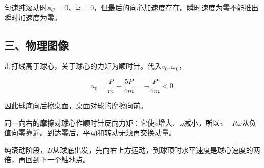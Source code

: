 \documentclass[12pt,a4paper,fontset=fandol]{ctexart}
\begin{document}
匀速纯滚动时\(\mathbf a_C=0\)、\(\dot{\boldsymbol\omega}=0\)，但最后的向心加速度存在。瞬时速度为零不能推出瞬时加速度为零。

\subsection{三、物理图像}\label{ux4e09ux7269ux7406ux56feux50cf-1}

击打线高于球心，关于球心的力矩为顺时针。代入\(v_0,\omega_0\)，

\[
u_0=\frac Pm-\frac{5P}{4m}
=-\frac P{4m}<0.
\]

因此球底向后擦桌面，桌面对球的摩擦向前。

\begin{center}
\begin{minipage}{\linewidth}
\centering\begingroup{}
\ifdim\wd\diagrambox>.88\linewidth
\sbox{\diagrambox}{\resizebox{.88\linewidth}{!}{\usebox{\diagrambox}}}\fi
\ifdim\ht\diagrambox>.38\textheight
\resizebox{!}{.38\textheight}{\usebox{\diagrambox}}
\else\usebox{\diagrambox}\fi
\par{}\endgroup\end{minipage}\end{center}

同一向右的摩擦对球心作顺时针反向力矩：它使\(v\)增大、\(\omega\)减小，所以\(v-R\omega\)从负值向零靠近。到达零后，平动和转动无须再交换动量。

纯滚动阶段，\(B\)从球底出发，先向右上方运动，到球顶时水平速度是球心速度的两倍，再回到下一个触地点。
\end{document}
